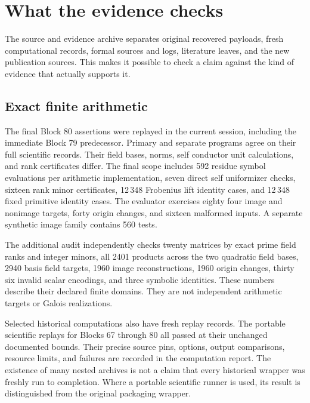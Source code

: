 \section{What the evidence checks}\label{sec:evidence}
The source and evidence archive separates original recovered payloads, fresh computational records, formal sources and logs, literature leaves, and the new publication sources. This makes it possible to check a claim against the kind of evidence that actually supports it.

\subsection{Exact finite arithmetic}
The final Block 80 assertions were replayed in the current session, including the immediate Block 79 predecessor. Primary and separate programs agree on their full scientific records. Their field bases, norms, self conductor unit calculations, and rank certificates differ. The final scope includes 592 residue symbol evaluations per arithmetic implementation, seven direct self uniformizer checks, sixteen rank minor certificates, 12\,348 Frobenius lift identity cases, and 12\,348 fixed primitive identity cases. The evaluator exercises eighty four image and nonimage targets, forty origin changes, and sixteen malformed inputs. A separate synthetic image family contains 560 tests.

The additional audit independently checks twenty matrices by exact prime field ranks and integer minors, all 2401 products across the two quadratic field bases, 2940 basis field targets, 1960 image reconstructions, 1960 origin changes, thirty six invalid scalar encodings, and three symbolic identities. These numbers describe their declared finite domains. They are not independent arithmetic targets or Galois realizations.

Selected historical computations also have fresh replay records. The portable scientific replays for Blocks 67 through 80 all passed at their unchanged documented bounds. Their precise source pins, options, output comparisons, resource limits, and failures are recorded in the computation report. The existence of many nested archives is not a claim that every historical wrapper was freshly run to completion. Where a portable scientific runner is used, its result is distinguished from the original packaging wrapper.

